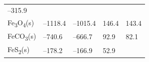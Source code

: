 \documentclass[
  9pt,
]{extbook}
\theoremstyle{definition}
\theoremstyle{definition}
\theoremstyle{definition}
\theoremstyle{remark}
\begin{document}
\begin{longtable}[]{@{}lllll@{}}
\begin{minipage}[t]{0.18\columnwidth}
--315.9 \textbar{}\strut
\end{minipage} & \begin{minipage}[t]{0.18\columnwidth}\raggedright
\strut
\end{minipage}\tabularnewline
\begin{minipage}[t]{0.10\columnwidth}\raggedright
Fe\textsubscript{3}O\textsubscript{4}(s)\strut
\end{minipage} & \begin{minipage}[t]{0.19\columnwidth}\raggedright
--1118.4\strut
\end{minipage} & \begin{minipage}[t]{0.20\columnwidth}\raggedright
--1015.4\strut
\end{minipage} & \begin{minipage}[t]{0.18\columnwidth}\raggedright
146.4\strut
\end{minipage} & \begin{minipage}[t]{0.18\columnwidth}\raggedright
143.4\strut
\end{minipage}\tabularnewline
\begin{minipage}[t]{0.10\columnwidth}\raggedright
FeCO\textsubscript{3}(s)\strut
\end{minipage} & \begin{minipage}[t]{0.19\columnwidth}\raggedright
--740.6\strut
\end{minipage} & \begin{minipage}[t]{0.20\columnwidth}\raggedright
--666.7\strut
\end{minipage} & \begin{minipage}[t]{0.18\columnwidth}\raggedright
92.9\strut
\end{minipage} & \begin{minipage}[t]{0.18\columnwidth}\raggedright
82.1\strut
\end{minipage}\tabularnewline
\begin{minipage}[t]{0.10\columnwidth}\raggedright
FeS\textsubscript{2}(s)\strut
\end{minipage} & \begin{minipage}[t]{0.19\columnwidth}\raggedright
--178.2\strut
\end{minipage} & \begin{minipage}[t]{0.20\columnwidth}\raggedright
--166.9\strut
\end{minipage} & \begin{minipage}[t]{0.18\columnwidth}\raggedright
52.9\strut
\end{minipage} & \begin{minipage}[t]{0.18\columnwidth}\raggedright

\end{minipage}
\end{longtable}
\end{document}
